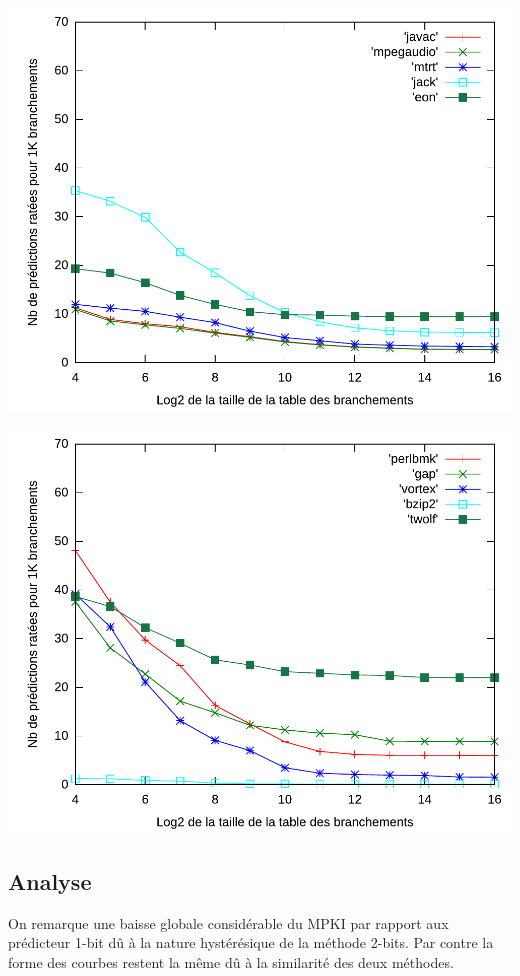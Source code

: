 \documentclass[a4paper]{article}
\begin{document}
\begin{minipage}{.48\linewidth}
\includegraphics[width=\linewidth]{2-bit-2}
\end{minipage}%
\hfill
\begin{minipage}{.48\linewidth}
\includegraphics[width=\linewidth]{2-bit-3}
\end{minipage}
\subsection{Analyse}
On remarque une baisse globale considérable du MPKI par rapport aux prédicteur 1-bit dû à la nature hystérésique de la méthode 2-bits.
Par contre la forme des courbes restent la même dû à la similarité des deux méthodes.
\end{document}
